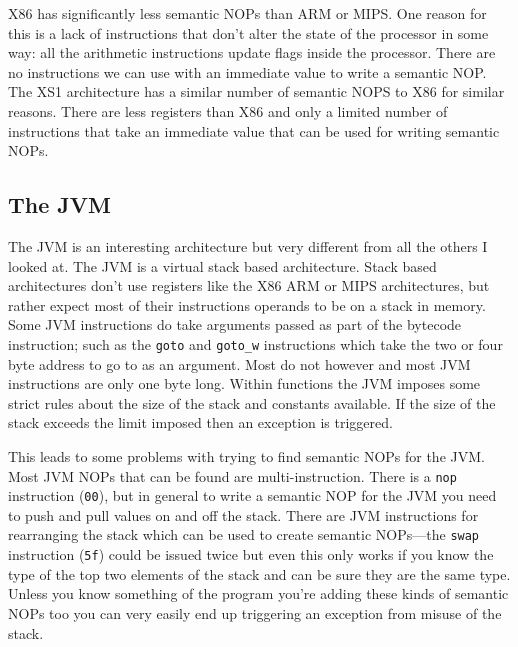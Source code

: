 \documentclass[12pt,]{book}
\begin{document}
X86 has significantly less semantic NOPs than ARM or MIPS. One reason
for this is a lack of instructions that don't alter the state of the
processor in some way: all the arithmetic instructions update flags
inside the processor. There are no instructions we can use with an
immediate value to write a semantic NOP. The XS1 architecture has a
similar number of semantic NOPS to X86 for similar reasons. There are
less registers than X86 and only a limited number of instructions that
take an immediate value that can be used for writing semantic NOPs.

\subsection{The JVM}

The JVM is an interesting architecture but very different from all the
others I looked at. The JVM is a virtual stack based
architecture\autocite{Lindholm:2012wy}. Stack based architectures don't
use registers like the X86 ARM or MIPS architectures, but rather expect
most of their instructions operands to be on a stack in memory. Some JVM
instructions do take arguments passed as part of the bytecode
instruction; such as the \lstinline!goto! and \lstinline!goto_w!
instructions which take the two or four byte address to go to as an
argument. Most do not however and most JVM instructions are only one
byte long. Within functions the JVM imposes some strict rules about the
size of the stack and constants available. If the size of the stack
exceeds the limit imposed then an exception is triggered.

This leads to some problems with trying to find semantic NOPs for the
JVM. Most JVM NOPs that can be found are multi-instruction. There is a
\lstinline!nop! instruction (\lstinline!00!), but in general to write a
semantic NOP for the JVM you need to push and pull values on and off the
stack. There are JVM instructions for rearranging the stack which can be
used to create semantic NOPs---the \lstinline!swap! instruction
(\lstinline!5f!) could be issued twice but even this only works if you
know the type of the top two elements of the stack and can be sure they
are the same type. Unless you know something of the program you're
adding these kinds of semantic NOPs too you can very easily end up
triggering an exception from misuse of the stack.
\end{document}
